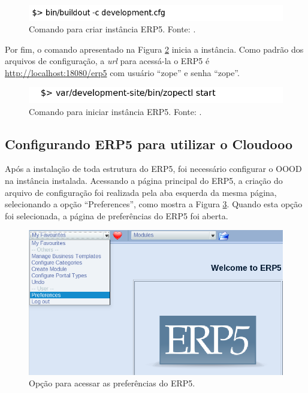 \begin{figure}[ht]
\centering
\begin{center}
\includegraphics[scale=0.660,bb=0 40 410 0]{criar_instancia_erp5.png}
\end{center}
\caption{Comando para criar instância ERP5. Fonte: \cite{erp5_buildout}.}
\label{fig:run_buildout_again}
\end{figure}

Por fim, o comando apresentado na Figura \ref{fig:iniciar_zope} inicia a instância. Como padrão dos arquivos de configuração, a \textit{url} para acessá-la o ERP5 é \url{http://localhost:18080/erp5} com usuário ``zope'' e senha ``zope''.

\begin{figure}[!ht]
\centering
\begin{center}
\includegraphics[scale=0.660,bb=0 50 410 0]{rodar_instancia.png}
\end{center}
\caption{Comando para iniciar instância ERP5. Fonte: \cite{erp5_buildout}.}
\label{fig:iniciar_zope}
\end{figure}

\subsection{Configurando ERP5 para utilizar o Cloudooo}

Após a instalação de toda estrutura do ERP5, foi necessário configurar o OOOD na instância instalada. Acessando a página principal do ERP5, a criação do arquivo de configuração foi realizada pela aba esquerda da mesma página, selecionando a opção ``Preferences'', como mostra a Figura \ref{fig:erp5_click_preferences}. Quando esta opção foi selecionada, a página de preferências do ERP5 foi aberta.

\begin{figure}[!ht]
\centering
\begin{center}
\includegraphics[scale=0.360,bb=0 0 610 290]{erp5_click_preferences.png}
\end{center}
\caption{Opção para acessar as preferências do ERP5.}
\label{fig:erp5_click_preferences}
\end{figure}

